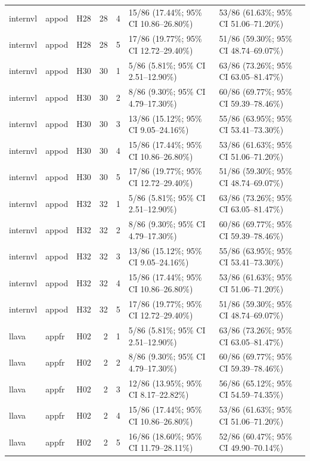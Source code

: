 \begin{longtable}{lllrrll}
internvl & appod & H28 & 28 & 4 & 15/86 (17.44\%; 95\% CI 10.86–26.80\%) & 53/86 (61.63\%; 95\% CI 51.06–71.20\%) \\
internvl & appod & H28 & 28 & 5 & 17/86 (19.77\%; 95\% CI 12.72–29.40\%) & 51/86 (59.30\%; 95\% CI 48.74–69.07\%) \\
internvl & appod & H30 & 30 & 1 & 5/86 (5.81\%; 95\% CI 2.51–12.90\%) & 63/86 (73.26\%; 95\% CI 63.05–81.47\%) \\
internvl & appod & H30 & 30 & 2 & 8/86 (9.30\%; 95\% CI 4.79–17.30\%) & 60/86 (69.77\%; 95\% CI 59.39–78.46\%) \\
internvl & appod & H30 & 30 & 3 & 13/86 (15.12\%; 95\% CI 9.05–24.16\%) & 55/86 (63.95\%; 95\% CI 53.41–73.30\%) \\
internvl & appod & H30 & 30 & 4 & 15/86 (17.44\%; 95\% CI 10.86–26.80\%) & 53/86 (61.63\%; 95\% CI 51.06–71.20\%) \\
internvl & appod & H30 & 30 & 5 & 17/86 (19.77\%; 95\% CI 12.72–29.40\%) & 51/86 (59.30\%; 95\% CI 48.74–69.07\%) \\
internvl & appod & H32 & 32 & 1 & 5/86 (5.81\%; 95\% CI 2.51–12.90\%) & 63/86 (73.26\%; 95\% CI 63.05–81.47\%) \\
internvl & appod & H32 & 32 & 2 & 8/86 (9.30\%; 95\% CI 4.79–17.30\%) & 60/86 (69.77\%; 95\% CI 59.39–78.46\%) \\
internvl & appod & H32 & 32 & 3 & 13/86 (15.12\%; 95\% CI 9.05–24.16\%) & 55/86 (63.95\%; 95\% CI 53.41–73.30\%) \\
internvl & appod & H32 & 32 & 4 & 15/86 (17.44\%; 95\% CI 10.86–26.80\%) & 53/86 (61.63\%; 95\% CI 51.06–71.20\%) \\
internvl & appod & H32 & 32 & 5 & 17/86 (19.77\%; 95\% CI 12.72–29.40\%) & 51/86 (59.30\%; 95\% CI 48.74–69.07\%) \\
llava & appfr & H02 & 2 & 1 & 5/86 (5.81\%; 95\% CI 2.51–12.90\%) & 63/86 (73.26\%; 95\% CI 63.05–81.47\%) \\
llava & appfr & H02 & 2 & 2 & 8/86 (9.30\%; 95\% CI 4.79–17.30\%) & 60/86 (69.77\%; 95\% CI 59.39–78.46\%) \\
llava & appfr & H02 & 2 & 3 & 12/86 (13.95\%; 95\% CI 8.17–22.82\%) & 56/86 (65.12\%; 95\% CI 54.59–74.35\%) \\
llava & appfr & H02 & 2 & 4 & 15/86 (17.44\%; 95\% CI 10.86–26.80\%) & 53/86 (61.63\%; 95\% CI 51.06–71.20\%) \\
llava & appfr & H02 & 2 & 5 & 16/86 (18.60\%; 95\% CI 11.79–28.11\%) & 52/86 (60.47\%; 95\% CI 49.90–70.14\%) \\

\end{longtable}
